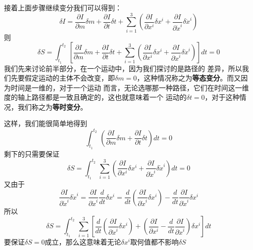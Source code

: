 \documentclass[UTF8,12pt]{ctexart}
\begin{document}
            接着上面步骤继续变分我们可以得到：
            \begin{equation} \delta I=\frac{\partial I}{\partial m}\delta m +\frac{\partial I}{\partial t}\delta t+
            \sum_{i=1}^{3}(\frac{\partial I}{\partial x^i}\delta x^i 
            +\frac{\partial I}{\partial \dot{x}^i}\delta \dot{x}^i) \end{equation}
            则
            \begin{equation}
            \delta S=\int_{t_1}^{t_2}  \,[\frac{\partial I}{\partial m}\delta m +\frac{\partial I}{\partial t}\delta t+
            \sum_{i=1}^{3}(\frac{\partial I}{\partial x^i}\delta x^i 
            +\frac{\partial I}{\partial \dot{x}^i}\delta \dot{x}^i)]dt  =0
            \end{equation}
            我们先来讨论前半部分，在一个运动中，因为我们探讨的是路径的
            差异，所以我们先要假定运动的主体不会改变，即$\delta m=0$，这种情况称之为\textbf{等态变分}。而又因为时间是一维的，对于一个运动
            而言，无论选哪那一种路径，它们在时间这一维度的轴上路径都是一致且确定的，这也就意味着一个
            运动的$\delta t=0$，对于这种情况，我们称之为\textbf{等时变分}。
            
            这样，我们能很简单地得到\begin{equation}
            \int_{t_1}^{t_2}\,(\frac{\partial I}{\partial m}\delta m+\frac{\partial I}{\partial t}\delta t)dt=0
            \end{equation}
            剩下的只需要保证
            \begin{equation}
            \delta S=\int_{t_1}^{t_2}\,\sum_{i=1}^{3}(\frac{\partial I}{\partial x^i}\delta x^i+\frac{\partial I}{\partial \dot{x}^i}\delta \dot{x}^i)dt=0
            \end{equation}
            又由于
            \begin{equation}
            \frac{\partial I}{\partial \dot{x}^i}\delta \dot{x}^i=\frac{\partial I}{\partial \dot{x}^i}\frac{d}{dt}\delta x^i=
            \frac{d}{dt}(\frac{\partial I}{\partial \dot{x}^i}\delta x^i)-\frac{d}{dt}\frac{\partial I}{\partial \dot{x}^i}\delta x^i
            \end{equation}
            所以
            \begin{equation}
            \delta S=\int_{t_1}^{t_2}\,\sum_{i=1}^3[\frac{d}{dt}(\frac{\partial I}{\partial \dot{x}^i}\delta x^i)+
            (\frac{\partial I}{\partial x^i}-\frac{d}{dt}\frac{\partial I}{\partial \dot{x}^i})\delta x^i]dt
            \end{equation}
            要保证$\delta S=0$成立，那么这意味着无论$\delta x^i$取何值都不影响$\delta S$
\end{document}
